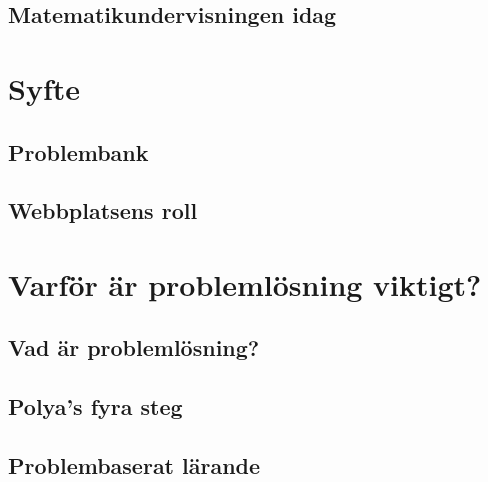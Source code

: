 \documentclass[11pt,a4paper]{article}
\begin{document}
    \subsection{Matematikundervisningen idag}
        
        
%        

\section{Syfte}
    
    
    \subsection{Problembank}
        
    
    \subsection{Webbplatsens roll}
        
\section{Varför är problemlösning viktigt?}
    \label{sec:Teori}
    
        
    \subsection{Vad är problemlösning?}
        \label{sec:problemdef}
        
        
    \subsection{Polya's fyra steg}
        \label{sec:polya}
        
        
    \subsection{Problembaserat lärande}
        \label{sec:pbl}
        
        
\end{document}
